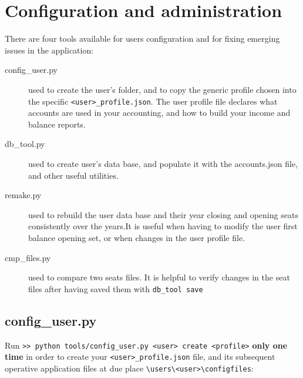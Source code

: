 \documentclass[12pt, a4paper]{article}
\begin{document}
 \section{Configuration and administration }
 There are four  tools available for users configuration and for fixing emerging issues in the application:
 
 \begin{description}
 \item[config\_user.py] used to create the user's folder, and to copy the generic profile chosen into the specific \verb!<user>_profile.json!.
   The user profile file declares what accounts are used in your accounting,  and  how to build your income and balance reports.  
 \item[db\_tool.py] used to create user's data base, and populate it with the accounts.json file, and other useful utilities.
  \item[remake.py] used to rebuild the user data base and their year closing and opening seats consistently over the years.It is useful when having to modify the user first balance opening set, or when changes in the user profile file.
 \item[cmp\_files.py] used to compare two seats files. It is helpful to verify changes in the seat files after having saved them with \verb!db_tool save!
 \end{description}
 
 \subsection{config\_user.py}
 Run \verb!>> python tools/config_user.py <user> create <profile>! \textbf{only one time} in order to create your \verb!<user>_profile.json! file, and its subsequent  operative application files at due place 
 \verb!\users\<user>\configfiles!:
\begin{figure}[h]
\centering
{}
 \end{figure}
  
\end{document}
